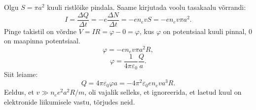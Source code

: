 Olgu $S=\pi a^2$ kuuli ristlõike pindala. Saame kirjutada voolu tasakaalu võrrandi:
$$I = \frac{\Delta Q}{\Delta t} = -e \frac{\Delta N}{\Delta t} = -e n_e v S = -e n_e v \pi a^2.$$
Pinge takistil on võrdne $V = I R = \varphi - 0 = \varphi$, kus $\varphi$ on potentsiaal kuuli pinnal, 0 on maapinna potentsiaal.
$$\varphi = -e n_e v \pi a^2 R,$$
$$\varphi = \frac{1}{4 \pi \varepsilon_0} \frac{Q}{a}.$$
Siit leiame:
$$Q = 4 \pi \varepsilon_0 \varphi a = -4 \pi^2 \varepsilon_0 e n_e v a^3 R.$$
Eeldus, et $v \gg n_e e^2 a^2 R / m$, oli vajalik selleks, et ignoreerida, et laetud kuul on elektronide liikumisele vastu, tõrjudes neid.
\probend